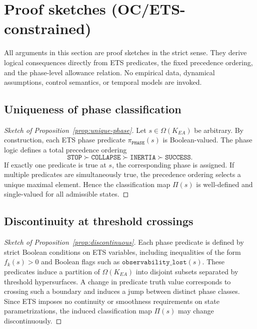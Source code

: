 ﻿\section{Proof sketches (OC/ETS-constrained)}
\label{sec:proofs}

All arguments in this section are proof sketches in the strict sense.
They derive logical consequences directly from ETS predicates, the fixed
precedence ordering, and the phase-level allowance relation.
No empirical data, dynamical assumptions, control semantics, or temporal
models are invoked.

\subsection{Uniqueness of phase classification}

\begin{proof}[Sketch of Proposition~\ref{prop:unique-phase}]
Let $s \in \Omega(K_{EA})$ be arbitrary.
By construction, each ETS phase predicate
$\pi_{\texttt{PHASE}}(s)$ is Boolean-valued.
The phase logic defines a total precedence ordering
\[
\texttt{STOP} \succ \texttt{COLLAPSE} \succ \texttt{INERTIA} \succ \texttt{SUCCESS}.
\]
If exactly one predicate is true at $s$, the corresponding phase is assigned.
If multiple predicates are simultaneously true, the precedence ordering
selects a unique maximal element.
Hence the classification map $\Pi(s)$ is well-defined and single-valued
for all admissible states.
\end{proof}

\subsection{Discontinuity at threshold crossings}

\begin{proof}[Sketch of Proposition~\ref{prop:discontinuous}]
Each phase predicate is defined by strict Boolean conditions on ETS variables,
including inequalities of the form $f_k(s) > 0$ and Boolean flags such as
$\texttt{observability\_lost}(s)$.
These predicates induce a partition of $\Omega(K_{EA})$ into disjoint
subsets separated by threshold hypersurfaces.
A change in predicate truth value corresponds to crossing such a boundary
and induces a jump between distinct phase classes.
Since ETS imposes no continuity or smoothness requirements on state
parametrizations, the induced classification map $\Pi(s)$ may change
discontinuously.
\end{proof}

